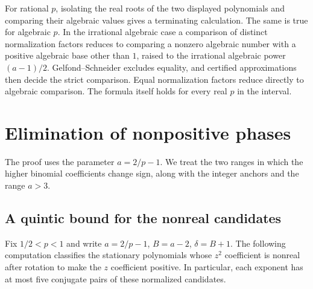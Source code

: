 \documentclass[11pt]{article}
\begin{document}
For rational \(p\), isolating the real roots of the two displayed
polynomials and comparing their algebraic values gives a terminating
calculation. The same is true for algebraic \(p\). In the irrational
algebraic case a comparison of distinct normalization factors
reduces to comparing a nonzero algebraic number with a positive
algebraic base other than \(1\), raised to the irrational algebraic
power \((a-1)/2\). Gelfond--Schneider excludes equality, and certified
approximations then decide the strict comparison. Equal normalization
factors reduce directly to algebraic comparison. The formula itself
holds for every real \(p\) in the interval.

\section{Elimination of nonpositive phases}

The proof uses the parameter \(a=2/p-1\). We treat the two ranges in
which the higher binomial coefficients change sign, along with the
integer anchors and the range \(a>3\).

\subsection{A quintic bound for the nonreal candidates}
\label{sec:nonreal-candidates}
Fix \(1/2<p<1\) and write \(a=2/p-1\), \(B=a-2\),
\(\delta=B+1\). The following computation classifies the stationary
polynomials whose \(z^2\) coefficient is nonreal after rotation to
make the \(z\) coefficient positive. In particular, each exponent has
at most five conjugate pairs of these normalized candidates.
\end{document}
